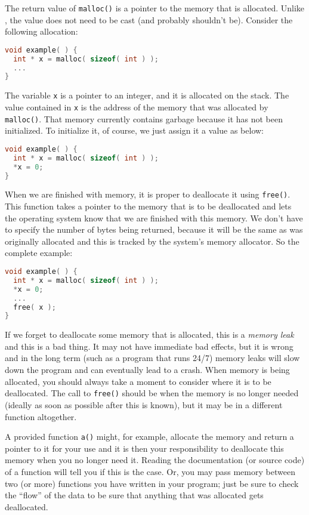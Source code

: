 The return value of \texttt{malloc()} is a pointer to the memory that is allocated. Unlike \Cpp, the value does not need to be cast (and probably shouldn't be). 
Consider the following allocation:

\begin{lstlisting}[language=C]
void example( ) {
  int * x = malloc( sizeof( int ) );
  ...
}
\end{lstlisting}

The variable \texttt{x} is a pointer to an integer, and it is allocated on the stack. The value contained in \texttt{x} is the address of the memory that was allocated by \texttt{malloc()}. That memory currently contains garbage because it has not been initialized. To initialize it, of course, we just assign it a value as below:

\begin{lstlisting}[language=C]
void example( ) {
  int * x = malloc( sizeof( int ) );
  *x = 0;
}
\end{lstlisting}

When we are finished with memory, it is proper to deallocate it using \texttt{free()}. This function takes a pointer to the memory that is to be deallocated and lets the operating system know that we are finished with this memory. We don't have to specify the number of bytes being returned, because it will be the same as was originally allocated and this is tracked by the system's memory allocator. So the complete example:

\begin{lstlisting}[language=C]
void example( ) {
  int * x = malloc( sizeof( int ) );
  *x = 0;
  ...
  free( x );
}
\end{lstlisting}

If we forget to deallocate some memory that is allocated, this is a \textit{memory leak} and this is a bad thing. It may not have immediate bad effects, but it is wrong and in the long term (such as a program that runs 24/7) memory leaks will slow down the program and can eventually lead to a crash. When memory is being allocated, you should always take a moment to consider where it is to be deallocated. The call to \texttt{free()} should be when the memory is no longer needed (ideally as soon as possible after this is known), but it may be in a different function altogether. 

A provided function \texttt{a()} might, for example, allocate the memory and return a pointer to it for your use and it is then your responsibility to deallocate this memory when you no longer need it. Reading the documentation (or source code) of a function will tell you if this is the case. Or, you may pass memory between two (or more) functions you have written in your program; just be sure to check the ``flow'' of the data to be sure that anything that was allocated gets deallocated.

